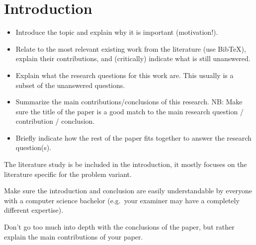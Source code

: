 \section{Introduction}
\begin{itemize}
\item Introduce the topic and explain why it is important (motivation!). %

\item Relate to the most relevant existing work from the literature (use BibTeX), explain their contributions, and (critically) indicate what is still unanswered. 

\item Explain what the research questions for this work are. 
This usually is a subset of the unanswered questions. %

\item Summarize the main contributions/conclusions of this research.
NB: Make sure the title of the paper is a good match to the main research question / contribution / conclusion.

\item Briefly indicate how the rest of the paper fits together to answer the research question(s).
\end{itemize}

The literature study is be included in the introduction, it mostly focuses on the literature specific for the problem variant.

Make sure the introduction and conclusion are easily understandable by everyone with a computer science bachelor (e.g.\ your examiner may have a completely different expertise).

Don't go too much into depth with the conclusions of the paper, but rather explain the main contributions of your paper.
